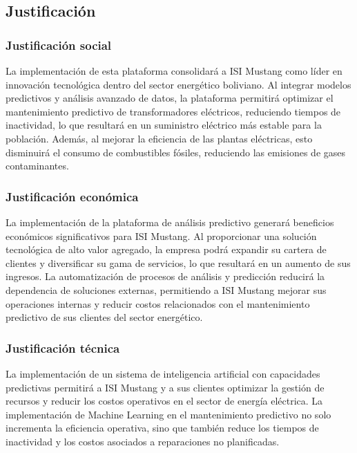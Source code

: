 \documentclass{univalle-perfil}
\begin{document}
\subsection{Justificación}

\subsubsection{Justificación social}

La implementación de esta plataforma consolidará a ISI Mustang como líder en
innovación tecnológica dentro del sector energético boliviano. Al integrar modelos
predictivos y análisis avanzado de datos, la plataforma permitirá optimizar el
mantenimiento predictivo de transformadores eléctricos, reduciendo tiempos de
inactividad, lo que resultará en un suministro eléctrico más estable para la
población. Además, al mejorar la eficiencia de las plantas eléctricas, esto disminuirá
el consumo de combustibles fósiles, reduciendo las emisiones de gases contaminantes.

\subsubsection{Justificación económica}

La implementación de la plataforma de análisis predictivo generará beneficios
económicos significativos para ISI Mustang. Al proporcionar una solución tecnológica
de alto valor agregado, la empresa podrá expandir su cartera de clientes y
diversificar su gama de servicios, lo que resultará en un aumento de sus ingresos.
La automatización de procesos de análisis y predicción reducirá la dependencia de
soluciones externas, permitiendo a ISI Mustang mejorar sus operaciones internas y
reducir costos relacionados con el mantenimiento predictivo de sus clientes del
sector energético.

\subsubsection{Justificación técnica}

La implementación de un sistema de inteligencia artificial con capacidades
predictivas permitirá a ISI Mustang y a sus clientes optimizar la gestión de recursos y
reducir los costos operativos en el sector de energía eléctrica. La implementación de
Machine Learning en el mantenimiento predictivo no solo incrementa la eficiencia
operativa, sino que también reduce los tiempos de inactividad y los costos asociados
a reparaciones no planificadas.
\end{document}
